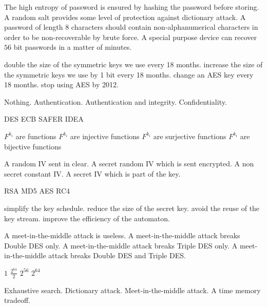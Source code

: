 {The high entropy of password is ensured by hashing the password before storing.}
{A random salt provides some level of protection against dictionary attack.}
{A password of length $8$ characters should contain non-alphanumerical characters in order to be non-recoverable by brute force.}
{A special purpose device can recover $56$ bit passwords in a matter of minutes.}

{double the size of the symmetric keys we use every 18 months.}
{increase the size of the symmetric keys we use by 1 bit every 18 months.}
{change an AES key every 18 months.}
{stop using AES by 2012.}

%
{Nothing.}
{Authentication.}
{Authentication and integrity.}
{Confidentiality.}

%
{DES}
{ECB}
{SAFER}
{IDEA}

%
{$F^{k_i}$ are functions}%
{$F^{k_i}$ are injective functions}%
{$F^{k_i}$ are surjective functions}%
{$F^{k_i}$ are bijective functions}%

{A random IV sent in clear.}%
{A secret random IV which is sent encrypted.}%
{A non secret constant IV.}%
{A secret IV which is part of the key.}%

%
{RSA}%
{MD5}%
{AES}%
{RC4}%

%
{simplify the key schedule.}%
{reduce the size of the secret key.}%
{avoid the reuse of the key stream.}%
{improve the efficiency of the automaton.}%

%
{A meet-in-the-middle attack is useless.}%
{A meet-in-the-middle attack breaks Double DES only.}%
{A meet-in-the-middle attack breaks Triple DES only.}%
{A meet-in-the-middle attack breaks Double DES and Triple DES.}%

%
{$1$}%
{$\frac{2^{64}}{2}$}%
{$2^{56}$}%
{$2^{64}$}%

%
{Exhaustive search.}%
{Dictionary attack.}%
{Meet-in-the-middle attack.}%
{A time memory tradeoff.}%


